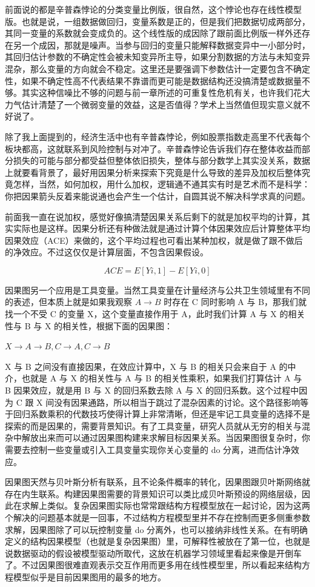 \documentclass[]{tufte-book}
\begin{document}
前面说的都是辛普森悖论的分类变量比例版，很自然，这个悖论也存在线性模型版。也就是说，一组数据做回归，变量系数是正的，但是我们把数据切成两部分，其同一变量的系数就会变成负的。这个线性版的成因除了跟前面比例版一样外还存在另一个成因，那就是噪声。当参与回归的变量只能解释数据变异中一小部分时，其回归估计参数的不确定性会被未知变异所主导，如果分割数据的方法与未知变异混杂，那么变量的方向就会不稳定。这里还是要强调下参数估计一定要包含不确定性，如果不确定性高不代表结果不靠谱而更可能是数据结构还没搞清楚或数据量不够。其实这种信噪比不够的问题与前一章所述的可重复性危机有关，也许我们花大力气估计清楚了一个微弱变量的效益，这是否值得？学术上当然值但现实意义就不好说了。

除了我上面提到的，经济生活中也有辛普森悖论，例如股票指数走高里不代表每个板块都高，这就联系到风险控制与对冲了。辛普森悖论告诉我们存在整体收益而部分损失的可能与部分都受益但整体依旧损失，整体与部分数学上其实没关系，数据上就要看背景了，最好用因果分析来探索下究竟是什么导致的差异及加权后整体究竟怎样，当然，如何加权，用什么加权，逻辑通不通其实有时是艺术而不是科学：你把因果箭头反着来能说通也会产生一个估计，自圆其说不解决科学求真的问题。

前面我一直在说加权，感觉好像搞清楚因果关系后剩下的就是加权平均的计算，其实实际也是这样。因果分析还有种做法就是通过计算个体因果效应后计算整体平均因果效应（ACE）来做的，这个平均过程也可看出某种加权，就是做了跟不做后的净效应。不过这仅仅是计算层面，不包含因果假设。

\[ACE = E[Y{i,1}] −E[Y{i,0}]\]

因果图另一个应用是工具变量。当然工具变量在计量经济与公共卫生领域里有不同的表述，但本质上就是如果我观察 \(A \rightarrow B\) 时存在 C 同时影响 A 与 B，那我们就找一个不受 C 的变量 X，这个变量直接作用于 A，此时我们计算 A 与 X 的相关性与 B 与 X 的相关性，根据下面的因果图：

\(X \rightarrow A \rightarrow B, C \rightarrow A, C \rightarrow B\)

X 与 B 之间没有直接因果，在效应计算中，X 与 B 的相关只会来自于 A 的中介，也就是 A 与 X 的相关性与 A 与 B 的相关性乘积，如果我们打算估计 A 与 B 因果效应，就是用 B 与 X 的回归系数去除 A 与 X 的回归系数。这个过程中因为 C 跟 X 间没有因果通路，所以相当于跳过了混杂因素的讨论。这个路径影响等于回归系数乘积的代数技巧使得计算上非常清晰，但还是牢记工具变量的选择不是探索的而是因果的，需要背景知识。有了工具变量，研究人员就从无穷的相关与混杂中解放出来而可以通过因果图构建来求解目标因果关系。当因果图很复杂时，你需要去控制一些变量或引入工具变量实现你关心变量的 do 分离，进而估计净效应。

因果图天然与贝叶斯分析有联系，且不论条件概率的转化，因果图跟贝叶斯网络就存在内生联系。构建因果图需要的背景知识可以类比成贝叶斯预设的网络层级，因此在求解上类似。复杂因果图实际也常常跟结构方程模型放在一起讨论，因为这两个解决的问题基本就是一回事，不过结构方程模型里并不存在控制而更多侧重参数求解，因果图除了可以玩控制变量 do 分离外，也可以接纳非线性关系。在有明确定义的结构因果模型（也就是复杂因果图）里，可解释性被放在了第一位，也就是说数据驱动的假设被模型驱动所取代，这放在机器学习领域里看起来像是开倒车了。不过因果图很难直观表示交互作用而更多用在线性模型里，所以看起来结构方程模型似乎是目前因果图用的最多的地方。
\end{document}

